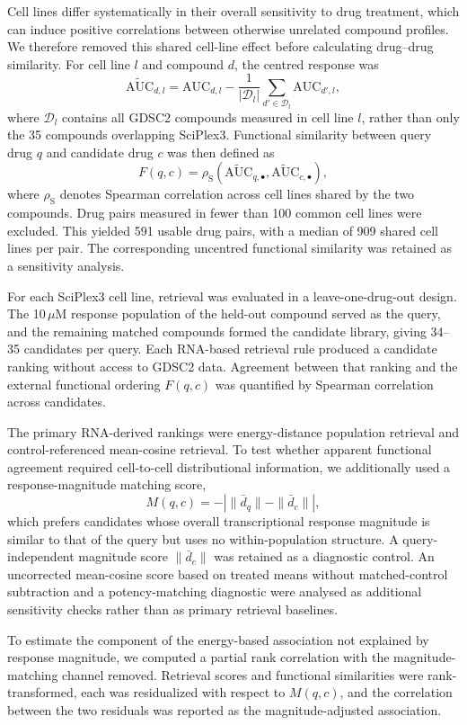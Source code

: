 \documentclass[11pt,letterpaper]{article}
\begin{document}
Cell lines differ systematically in their overall sensitivity to drug treatment, which can induce
positive correlations between otherwise unrelated compound profiles. We therefore removed this
shared cell-line effect before calculating drug--drug similarity. For cell line $l$ and compound
$d$, the centred response was
$$
\widetilde{\mathrm{AUC}}_{d,l}
=
\mathrm{AUC}_{d,l}
-
\frac{1}{|\mathcal D_l|}
\sum_{d'\in\mathcal D_l}\mathrm{AUC}_{d',l},
$$
where $\mathcal D_l$ contains all GDSC2 compounds measured in cell line $l$, rather than only the
35 compounds overlapping SciPlex3. Functional similarity between query drug $q$ and candidate
drug $c$ was then defined as
$$
F(q,c)
=
\rho_{\mathrm{S}}
\left(
\widetilde{\mathrm{AUC}}_{q,\bullet},
\widetilde{\mathrm{AUC}}_{c,\bullet}
\right),
$$
where $\rho_{\mathrm{S}}$ denotes Spearman correlation across cell lines shared by the two
compounds. Drug pairs measured in fewer than 100 common cell lines were excluded. This yielded
591 usable drug pairs, with a median of 909 shared cell lines per pair. The corresponding
uncentred functional similarity was retained as a sensitivity analysis.

For each SciPlex3 cell line, retrieval was evaluated in a leave-one-drug-out design. The
10\,$\mu$M response population of the held-out compound served as the query, and the remaining
matched compounds formed the candidate library, giving 34--35 candidates per query. Each RNA-based
retrieval rule produced a candidate ranking without access to GDSC2 data. Agreement between that
ranking and the external functional ordering $F(q,c)$ was quantified by Spearman correlation
across candidates.

The primary RNA-derived rankings were energy-distance population retrieval and control-referenced
mean-cosine retrieval. To test whether apparent functional agreement required cell-to-cell
distributional information, we additionally used a response-magnitude matching score,
$$
M(q,c)
=
-\left|
\|\bar d_q\|-\|\bar d_c\|
\right|,
$$
which prefers candidates whose overall transcriptional response magnitude is similar to that of
the query but uses no within-population structure. A query-independent magnitude score
$\|\bar d_c\|$ was retained as a diagnostic control. An uncorrected mean-cosine score based on
treated means without matched-control subtraction and a potency-matching diagnostic were analysed
as additional sensitivity checks rather than as primary retrieval baselines.

To estimate the component of the energy-based association not explained by response magnitude, we
computed a partial rank correlation with the magnitude-matching channel removed. Retrieval scores
and functional similarities were rank-transformed, each was residualized with respect to
$M(q,c)$, and the correlation between the two residuals was reported as the magnitude-adjusted
association.
\end{document}
